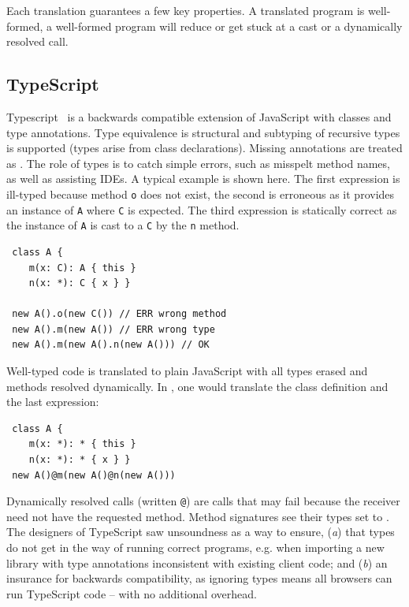 \documentclass[acmlarge, anonymous, authordraft]{acmart}
\newcommand{\code}[1]{{\tt #1}\xspace}
\begin{document}
\noindent
Each translation guarantees a few key properties. A translated program is
well-formed, a well-formed program will reduce or get stuck at a cast or a
dynamically resolved call.



\subsection{TypeScript}


Typescript~\cite{BAT14} is a backwards compatible extension of JavaScript with
classes and type annotations. Type equivalence is structural and subtyping of
recursive types is supported (types arise from class declarations). Missing
annotations are treated as \any. The role of types is to catch simple errors,
such as misspelt method names, as well as assisting IDEs.  A typical example is
shown here. The first expression is ill-typed because method \code o does not
exist, the second is erroneous as it provides an instance of \code A where \code
C is expected. The third expression is statically correct as the instance of
\code A is cast to a \code C by the \code{n} method.

\begin{lstlisting}
 class A { 
    m(x: C): A { this }
    n(x: *): C { x } }

 new A().o(new C()) // ERR wrong method
 new A().m(new A()) // ERR wrong type
 new A().m(new A().n(new A())) // OK 
\end{lstlisting}

\noindent
Well-typed code is translated to plain JavaScript with all types erased and
methods resolved dynamically. In \kafka, one would translate the class
definition and the last expression:

\begin{lstlisting}
 class A { 
    m(x: *): * { this }
    n(x: *): * { x } }
 new A()@m(new A()@n(new A()))    
\end{lstlisting}

\noindent Dynamically resolved calls (written \code @) are calls that may fail
because the receiver need not have the requested method. Method signatures see
their types set to \any.  The designers of TypeScript saw unsoundness as a way
to ensure, ({\em a}) that types do not get in the way of running correct
programs, e.g. when importing a new library with type annotations inconsistent
with existing client code; and ({\em b}) an insurance for backwards
compatibility, as ignoring types means all browsers can run TypeScript code --
with no additional overhead.
\end{document}
